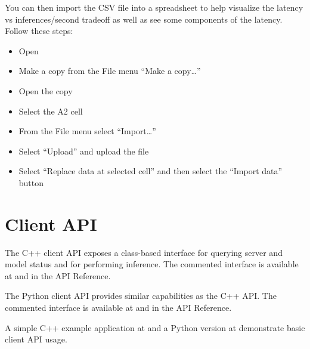 \documentclass[letterpaper,10pt,english]{sphinxmanual}
\begin{document}
You can then import the CSV file into a spreadsheet to help visualize
the latency vs inferences/second tradeoff as well as see some
components of the latency. Follow these steps:
\begin{itemize}
\item {} 
Open 

\item {} 
Make a copy from the File menu “Make a copy…”

\item {} 
Open the copy

\item {} 
Select the A2 cell

\item {} 
From the File menu select “Import…”

\item {} 
Select “Upload” and upload the file

\item {} 
Select “Replace data at selected cell” and then select the “Import data” button

\end{itemize}


\section{Client API}
\label{\detokenize{client:client-api}}\label{\detokenize{client:section-client-api}}
The C++ client API exposes a class-based interface for querying server
and model status and for performing inference. The commented interface
is available at 
and in the API Reference.

The Python client API provides similar capabilities as the C++
API. The commented interface is available at
and in the API Reference.

A simple C++ example application at 
and a Python version at 
demonstrate basic client API usage.
\end{document}
